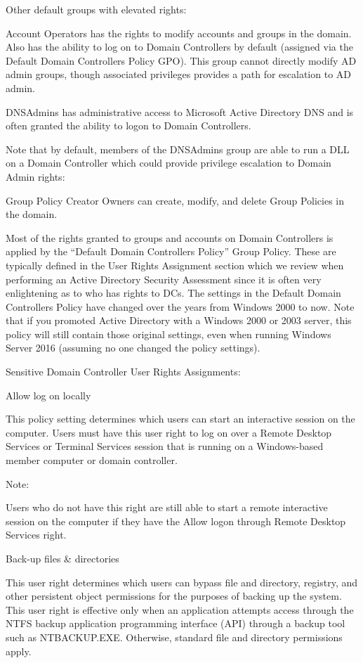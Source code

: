 Other default groups with elevated rights:

Account Operators has the rights to modify accounts and groups in the domain. Also has the ability to log on to Domain Controllers by default (assigned via the Default Domain Controllers Policy GPO). This group cannot directly modify AD admin groups, though associated privileges provides a path for escalation to AD admin.

DNSAdmins has administrative access to Microsoft Active Directory DNS and is often granted the ability to logon to Domain Controllers.

Note that by default, members of the DNSAdmins group are able to run a DLL on a Domain Controller which could provide privilege escalation to Domain Admin rights: 

Group Policy Creator Owners can create, modify, and delete Group Policies in the domain.

Most of the rights granted to groups and accounts on Domain Controllers is applied by the “Default Domain Controllers Policy” Group Policy. These are typically defined in the User Rights Assignment section which we review when performing an Active Directory Security Assessment since it is often very enlightening as to who has rights to DCs. The settings in the Default Domain Controllers Policy have changed over the years from Windows 2000 to now. Note that if you promoted Active Directory with a Windows 2000 or 2003 server, this policy will still contain those original settings, even when running Windows Server 2016 (assuming no one changed the policy settings).

Sensitive Domain Controller User Rights Assignments:

Allow log on locally

This policy setting determines which users can start an interactive session on the computer. Users must have this user right to log on over a Remote Desktop Services or Terminal Services session that is running on a Windows-based member computer or domain controller.

Note:

Users who do not have this right are still able to start a remote interactive session on the computer if they have the Allow logon through Remote Desktop Services right.

Back-up files \& directories

This user right determines which users can bypass file and directory, registry, and other persistent object permissions for the purposes of backing up the system. This user right is effective only when an application attempts access through the NTFS backup application programming interface (API) through a backup tool such as NTBACKUP.EXE. Otherwise, standard file and directory permissions apply.

